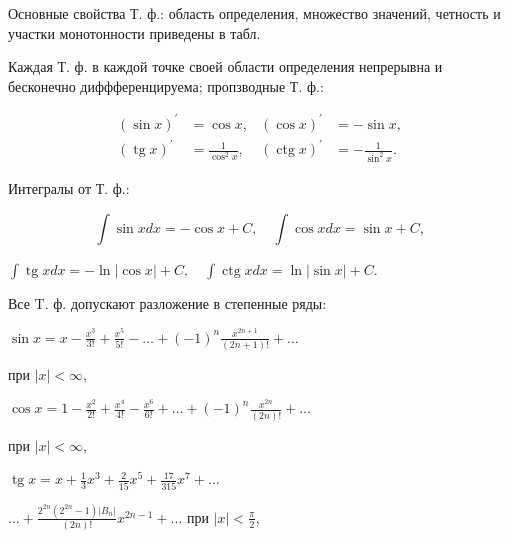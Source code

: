 \documentclass[10pt]{article}
\begin{document}
Основные свойства Т. ф.: область определения, множество значений, четность и участки монотонности приведены в табл.



Каждая Т. ф. в каждой точке своей области определения непрерывна и бесконечно диффференцируема; пропзводные Т. ф.:



\[

\begin{aligned}

(\sin x)^{\prime} & =\cos x, & (\cos x)^{\prime} & =-\sin x, \\

(\operatorname{tg} x)^{\prime} & =\frac{1}{\cos ^{2} x}, & (\operatorname{ctg} x)^{\prime} & =-\frac{1}{\sin ^{2} x} .

\end{aligned}

\]



Интегралы от Т. ф.:



\[

\int \sin x d x=-\cos x+C, \quad \int \cos x d x=\sin x+C,

\]



$\int \operatorname{tg} x d x=-\ln |\cos x|+C, \quad \int \operatorname{ctg} x d x=\ln |\sin x|+C$.



Все T. ф. допускают разложение в степенные ряды:



$\sin x=x-\frac{x^{3}}{3 !}+\frac{x^{5}}{5 !}-\ldots+(-1)^{n} \frac{x^{2 n+1}}{(2 n+1) !}+\ldots$



при $|x|<\infty$,



$\cos x=1-\frac{x^{2}}{2 !}+\frac{x^{4}}{4 !}-\frac{x^{6}}{6 !}+\ldots+(-1)^{n} \frac{x^{2 n}}{(2 n) !}+\ldots$



при $|x|<\infty$,



$\operatorname{tg} x=x+\frac{1}{3} x^{3}+\frac{2}{15} x^{5}+\frac{17}{315} x^{7}+\ldots$



$\ldots+\frac{2^{2 n}\left(2^{2 n}-1\right)\left|B_{n}\right|}{(2 n) !} x^{2 n-1}+\ldots$ при $|x|<\frac{\pi}{2}$,
\end{document}
